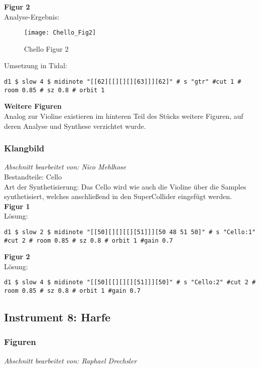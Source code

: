 \documentclass[
10pt, %
a4paper, %
oneside, %
headinclude,footinclude, %
BCOR5mm, %
]{scrartcl}
\begin{document}
\noindent\textbf{Figur 2}\\
Analyse-Ergebnis:
\begin{figure}[h]
	\centering 
	\texttt{[image: Chello\_Fig2]} 
	\caption{Chello Figur 2}
\end{figure}

\noindent Umsetzung in Tidal:
\begin{lstlisting}
d1 $ slow 4 $ midinote "[[62][[][][][63]]][62]" # s "gtr" #cut 1 # room 0.85 # sz 0.8 # orbit 1
\end{lstlisting}

\noindent\textbf{Weitere Figuren}\\
Analog zur Violine existieren im hinteren Teil des Stücks weitere Figuren, auf deren Analyse und Synthese verzichtet wurde.

\subsubsection{Klangbild}
\textit{Abschnitt bearbeitet von: Nico Mehlhose}\\

\noindent 
Bestandteile: Cello\\
Art der Synthetisierung: Das Cello wird wie auch die Violine über die Samples synthetisiert\cite{Orch}, welches anschließend in den SuperCollider eingefügt werden.\\

\noindent\textbf{Figur 1}\\
Lösung:
\begin{lstlisting}
d1 $ slow 2 $ midinote "[[50][][][[][51]]][50 48 51 50]" # s "Cello:1" #cut 2 # room 0.85 # sz 0.8 # orbit 1 #gain 0.7
\end{lstlisting}
\noindent\textbf{Figur 2}\\
Lösung:
\begin{lstlisting}
d1 $ slow 4 $ midinote "[[50][[][][][51]]][50]" # s "Cello:2" #cut 2 # room 0.85 # sz 0.8 # orbit 1 #gain 0.7
\end{lstlisting}

\subsection{Instrument 8: Harfe}
\subsubsection{Figuren}
\textit{Abschnitt bearbeitet von: Raphael Drechsler}\\
\end{document}
